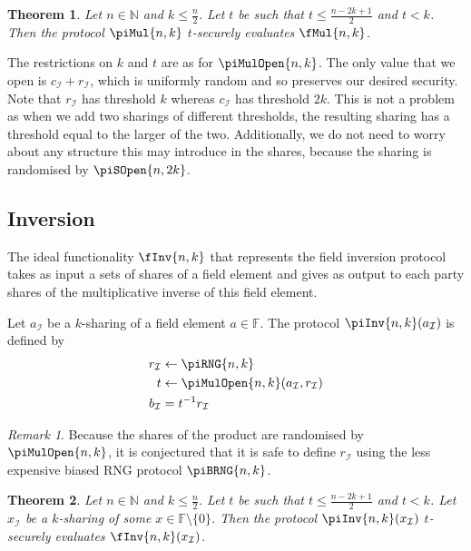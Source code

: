 \documentclass{article}
\newtheorem{theorem}{Theorem}
\theoremstyle{remark}
\newtheorem{remark}{Remark}
\newcommand{\N}{\mathbb{N}}
\newcommand{\F}{\mathbb{F}}
\begin{document}
\begin{theorem}
	Let $n \in \N$ and $k \le \frac{n}{2}$. Let $t$ be such that $t \le \frac{n
	- 2k + 1}{2}$ and $t < k$. Then the protocol $\piMul{n,k}$ $t$-securely
	evaluates $\fMul{n,k}$.
\end{theorem}

The restrictions on $k$ and $t$ are as for $\piMulOpen{n,k}$. The only value
that we open is $c_\mathcal{I} + r_\mathcal{I}$, which is uniformly random and
so preserves our desired security. Note that $r_\mathcal{I}$ has threshold $k$
whereas $c_\mathcal{I}$ has threshold $2k$. This is not a problem as when we
add two sharings of different thresholds, the resulting sharing has a threshold
equal to the larger of the two. Additionally, we do not need to worry about any
structure this may introduce in the shares, because the sharing is randomised
by $\piSOpen{n,2k}$.

\subsection{Inversion}

The ideal functionality $\fInv{n,k}$ that represents the field inversion
protocol takes as input a sets of shares of a field element and gives as output
to each party shares of the multiplicative inverse of this field element.

Let $a_\mathcal{I}$ be a $k$-sharing of a field element $a \in \F$. The
protocol $\piInv{n,k}(a_\mathcal{I})$ is defined by
\begin{align*}
	r_\mathcal{I} &\leftarrow \piRNG{n,k}\\
	t &\leftarrow \piMulOpen{n,k}(a_\mathcal{I}, r_\mathcal{I})\\
	b_\mathcal{I} &= t^{-1}r_\mathcal{I}
\end{align*}

\begin{remark}
	Because the shares of the product are randomised by $\piMulOpen{n,k}$, it
	is conjectured that it is safe to define $r_\mathcal{I}$ using the less
	expensive biased RNG protocol $\piBRNG{n,k}$.
\end{remark}

\begin{theorem}
	Let $n \in \N$ and $k \le \frac{n}{2}$. Let $t$ be such that $t \le \frac{n
	- 2k + 1}{2}$ and $t < k$. Let $x_\mathcal{I}$ be a $k$-sharing of some $x
	\in \F \setminus \{0\}$. Then the protocol $\piInv{n,k}(x_\mathcal{I})$
	$t$-securely evaluates $\fInv{n,k}(x_\mathcal{I})$.
\end{theorem}
\end{document}
